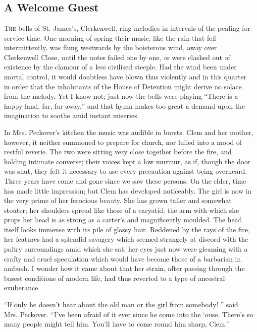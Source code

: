 \part{}

\chapter{A Welcome Guest}

\textsc{The} bells of St. James's, Clerkenwell, ring melodies in
intervals of the pealing for service-time. One morning of spring their
music, like the rain that fell intermittently, was flung westwards by
the boisterous wind, away over Clerkenwell Close, until the notes failed
one by one, or were clashed out of existence by the clamour of a less
civilised steeple. Had the wind been under mortal control, it would
doubtless have blown thus violently and in this quarter in order that
the inhabitants of the House of Detention might derive no solace from
the melody. Yet I know not; just now the bells were {}playing ``There is
a happy land, far, far away,'' and that hymn makes too great a demand
upon the imagination to soothe amid instant miseries.

In Mrs. Peckover's kitchen the music was audible in bursts. Clem and her
mother, however, it neither summoned to prepare for church, nor lulled
into a mood of restful reverie. The two were sitting very close together
before the fire, and holding intimate converse; their voices kept a low
murmur, as if, though the door was shut, they felt it necessary to use
every precaution against being overheard. Three years have come and gone
since we saw these persons. On the elder, time has made little
impression; but Clem has developed noticeably. The girl is now in the
very prime of her ferocious beauty. She has grown taller and somewhat
stouter; her shoulders spread like those of a caryatid; the arm with
which she props her head is as strong as a carter's and magnificently
moulded. The head itself looks immense with its pile of glossy hair.
{}Reddened by the rays of the fire, her features had a splendid savagery
which seemed strangely at discord with the paltry surroundings amid
which she sat; her eyes just now were gleaming with a crafty and cruel
speculation which would have become those of a barbarian in ambush. I
wonder how it came about that her strain, after passing through the
basest conditions of modern life, had thus reverted to a type of
ancestral exuberance.

``If only he doesn't hear about the old man or the girl from somebody!
'' said Mrs. Peckover. ``I've been afraid of it ever since he come into
the `ouse. There's so many people might tell him. You'll have to come
round him sharp, Clem.''

